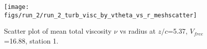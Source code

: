 \begin{figure}[H]
\centering
\texttt{[image: figs/run\_2/run\_2\_turb\_visc\_by\_vtheta\_vs\_r\_meshscatter]}
\caption{Scatter plot of mean total viscosity $\nu$ vs radius at $z/c$=5.37, $V_{free}$=16.88, station 1.}
\label{fig:run_2_turb_visc_by_vtheta_vs_r_meshscatter}
\end{figure}


